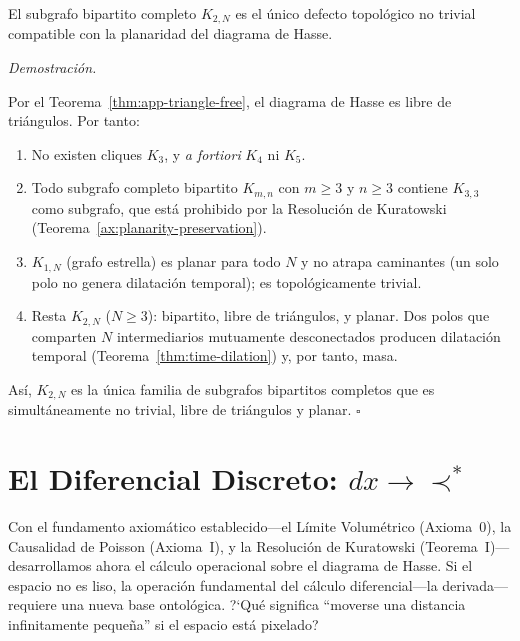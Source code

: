 \documentclass[11pt, a4paper, openany]{book}
\newcommand{\covers}{\prec^{\!*}}
\renewenvironment{proof}[1][Demostraci\'on]{%
  \par\noindent\textit{#1.}\quad
}{\hfill$\square$\par\medskip}
\begin{document}
\begin{theorem}
\label{thm:k2n-uniqueness}
El subgrafo bipartito completo $K_{2,N}$ es el \'unico defecto
topol\'ogico no trivial compatible con la planaridad del diagrama de
Hasse.
\end{theorem}

\begin{proof}
Por el Teorema~\ref{thm:app-triangle-free}, el diagrama de Hasse es
libre de tri\'angulos. Por tanto:
\begin{enumerate}
  \item No existen cliques $K_3$, y \emph{a fortiori} $K_4$ ni $K_5$.
  \item Todo subgrafo completo bipartito $K_{m,n}$ con $m \geq 3$ y
        $n \geq 3$ contiene $K_{3,3}$ como subgrafo, que est\'a prohibido
        por la Resoluci\'on de Kuratowski
        (Teorema~\ref{ax:planarity-preservation}).
  \item $K_{1,N}$ (grafo estrella) es planar para todo $N$ y no atrapa
        caminantes (un solo polo no genera dilataci\'on temporal); es
        topol\'ogicamente trivial.
  \item Resta $K_{2,N}$ ($N \geq 3$): bipartito, libre de tri\'angulos,
        y planar. Dos polos que comparten $N$ intermediarios mutuamente
        desconectados producen dilataci\'on temporal
        (Teorema~\ref{thm:time-dilation}) y, por tanto, masa.
\end{enumerate}
As\'i, $K_{2,N}$ es la \'unica familia de subgrafos bipartitos
completos que es simult\'aneamente no trivial, libre de tri\'angulos y
planar.
\end{proof}

\section{El Diferencial Discreto: $dx \to \covers$}
\label{sec:discrete-differential}

Con el fundamento axiom\'atico establecido---el L\'imite Volum\'etrico
(Axioma~0), la Causalidad de Poisson (Axioma~I), y la Resoluci\'on de
Kuratowski (Teorema~I)---desarrollamos ahora el c\'alculo operacional
sobre el diagrama de Hasse. Si el espacio no es liso, la operaci\'on
fundamental del c\'alculo diferencial---la derivada---requiere una nueva
base ontol\'ogica. ?`Qu\'e significa ``moverse una distancia
infinitamente peque\~na'' si el espacio est\'a pixelado?
\end{document}
